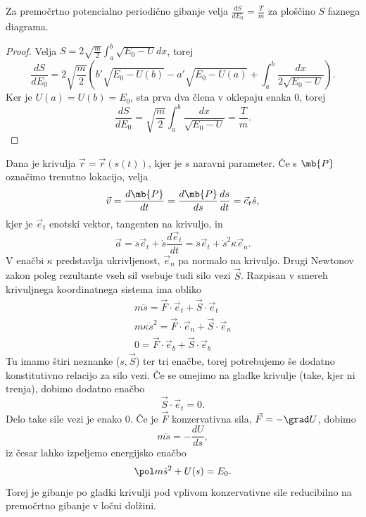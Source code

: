 
\begin{trditev}
  Za premočrtno potencialno periodično gibanje velja $\frac{dS}{dE_0} =
  \frac{T}{m}$ za ploščino $S$ faznega diagrama.
\end{trditev}

\begin{proof}
  Velja $S = 2 \sqrt{\frac{m}{2}} \int_a^b \sqrt{E_0 - U} dx$, torej
  \[
	\frac{dS}{dE_0} = 2 \sqrt{\frac{m}{2}} \left(
	  b' \sqrt{E_0 - U(b)} - a' \sqrt{E_0 - U(a)} + \int_a^b
	  \frac{dx}{2\sqrt{E_0 - U}}
	\right).
  \]
  Ker je $U(a) = U(b) = E_0$, sta prva dva člena v oklepaju enaka $0$, torej
  \[
	\frac{dS}{dE_0} = \sqrt{\frac{m}{2}} \int_a^b \frac{dx}{\sqrt{E_0-U}}
	= \frac{T}{m}.
  \]
\end{proof}



Dana je krivulja $\vec{r} = \vec{r}(s(t))$, kjer je $s$ naravni parameter.
Če s $\mb{P}$ označimo trenutno lokacijo, velja
\[
  \vec{v} = \frac{d\mb{P}}{dt} = \frac{d\mb{P}}{ds} \frac{ds}{dt} = \vec{e}_t
  \dot{s},
\]
kjer je $\vec{e}_t$ enotski vektor, tangenten na krivuljo, in
\[
  \vec{a} = \ddot{s} \vec{e}_t + \dot{s} \frac{d \vec{e}_t}{dt}
  = \ddot{s} \vec{e}_t + \dot{s}^2 \kappa \vec{e}_n.
\]
V enačbi $\kappa$ predstavlja ukrivljenost, $\vec{e}_n$ pa normalo na krivuljo.
Drugi Newtonov zakon poleg rezultante vseh sil vsebuje tudi silo vezi
$\vec{S}$.
Razpisan v smereh krivuljnega koordinatnega sistema ima obliko
\begin{gather*}
  m \ddot{s} = \vec{F} \cdot \vec{e}_t + \vec{S} \cdot \vec{e}_t \\
  m \kappa \dot{s}^2 = \vec{F} \cdot \vec{e}_n + \vec{S} \cdot \vec{e}_n \\
  0 = \vec{F} \cdot \vec{e}_b + \vec{S} \cdot \vec{e}_b
\end{gather*}
Tu imamo štiri neznanke ($s, \vec{S}$) ter tri enačbe, torej potrebujemo še
dodatno konstitutivno relacijo za silo vezi.
Če se omejimo na gladke krivulje (take, kjer ni trenja), dobimo dodatno enačbo
\[
  \vec{S} \cdot \vec{e}_t = 0.
\]
Delo take sile vezi je enako $0$.
Če je $\vec{F}$ konzervativna sila, $\vec{F} = - \grad U$, dobimo
\[
  m \ddot{s} = - \frac{dU}{ds},
\]
iz česar lahko izpeljemo energijsko enačbo
\[
  \pol m \dot{s}^2 + U(s) = E_0.
\]
Torej je gibanje po gladki krivulji pod vplivom konzervativne sile reducibilno
na premočrtno gibanje v ločni dolžini.


